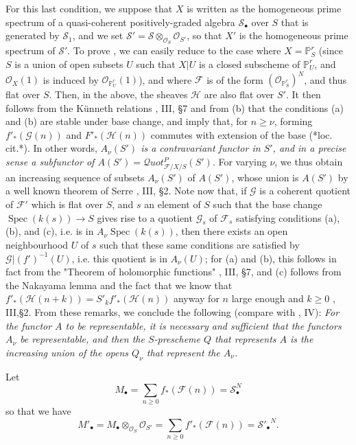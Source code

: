 For this last condition, we suppose that $X$ is written as the homogeneous prime spectrum of a quasi-coherent positively-graded algebra $\mathcal{S}_\bullet$ over $S$ that is generated by $\mathcal{S}_1$, and we set $\mathcal{S}'=\mathcal{S}\otimes_{\mathcal{O}_S}\mathcal{O}_{S'}$, so that $X'$ is the homogeneous prime spectrum of $\mathcal{S}'$.
To prove , we can easily reduce to the case where $X=\mathbb{P}_S^r$ (since $S$ is a union of open subsets $U$ such that $X|U$ is a closed subscheme of $\mathbb{P}_U^r$, and $\mathcal{O}_X(1)$ is induced by $\mathcal{O}_{\mathbb{P}_U^r} (1)$), and where $\mathcal{F}$ is of the form $(\mathcal{O}_{\mathbb{P}_S^r})^N$, and thus flat over $S$.
Then, in the above, the sheaves $\mathcal{H}$ are also flat over $S'$.
It then follows from the Künneth relations \cite{GD1960}, III, §7 and from (b) that the conditions (a) and (b) are stable under base change, and imply that, for $n\geqslant\nu$, forming $f'_*(\mathcal{G} (n))$ and $F'_*(\mathcal{H} (n))$ commutes with extension of the base (*loc. cit.*).
In other words, \emph{$A_\nu(S')$ is a contravariant functor in $S'$, and in a precise sense a subfunctor of $A(S')=\mathcal{Q}uot_{\mathcal{F}/X/S}^P(S')$}.
For varying $\nu$, we thus obtain an increasing sequence of subsets $A_\nu(S')$ of $A(S')$, whose union is $A(S')$ by a well known theorem of Serre \cite{GD1960}, III, §2.
Note now that, if $\mathcal{G}$ is a coherent quotient of $\mathcal{F}'$ which is flat over $S$, and $s$ an element of $S$ such that the base change $\operatorname{Spec}(k(s))\to S$ gives rise to a quotient $\mathcal{G}_s$ of $\mathcal{F}_s$ satisfying conditions (a), (b), and (c), i.e. is in $A_\nu\operatorname{Spec}(k(s))$, then there exists an open neighbourhood $U$ of $s$ such that these same conditions are satisfied by $\mathcal{G}|(f')^{-1} (U)$, i.e. this quotient is in $A_\nu(U)$;
for (a) and (b), this follows in fact from the "Theorem of holomorphic functions" \cite{GD1960}, III, §7, and (c) follows from the Nakayama lemma and the fact that we know that $f'_*(\mathcal{H} (n+k))=S'_kf'_*(\mathcal{H} (n))$ anyway for $n$ large enough and $k\geqslant0$ \cite{GD1960}, III,§2.
From these remarks, we conclude the following (compare with \cite{Gro1960a}, IV):
\emph{For the functor $A$ to be representable, it is necessary and sufficient that the functors $A_\nu$ be representable, and then the $S$-prescheme $Q$ that represents $A$ is the increasing union of the opens $Q_\nu$ that represent the $A_\nu$.}

Let
\[
  M_\bullet
  = \sum_{n\geqslant0} f_*(\mathcal{F} (n))
  = \mathcal{S}_\bullet^N
\]
so that we have
\[
  M'_\bullet
  = M_\bullet\otimes_{\mathcal{O}_S}\mathcal{O}_{S'}
  = \sum_{n\geqslant0} f'_*(\mathcal{F} (n))
  = {\mathcal{S}'_\bullet}^N.
\]


